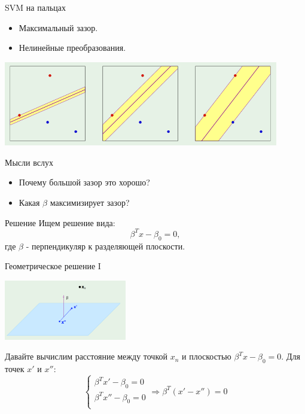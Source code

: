 \documentclass[14pt, fleqn, xcolor={dvipsnames, table}]{beamer}
\begin{document}
\begin{frame}{SVM на пальцах}
\begin{itemize}
  \item Максимальный зазор.
  \item Нелинейные преобразования.
\end{itemize}
\begin{center}
\includegraphics[width=0.9\textwidth]{SVM_1.png}
\end{center}
\end{frame}

\begin{frame}{Мысли вслух}
\begin{itemize}
  \item Почему большой зазор это хорошо?
  \item Какая $\beta$ максимизирует зазор? 
\end{itemize}
\end{frame}

\begin{frame}{Решение}
Ищем решение вида: \
$$
\beta^Tx - \beta_0 = 0,
$$ 
где $\beta$ - перпендикуляр к разделяющей плоскости. %

\end{frame}


\begin{frame}{Геометрическое решение I}
\begin{center}
\includegraphics[width=0.4\textwidth]{SVM_2.png}
\end{center}
Давайте вычислим расстояние между точкой $x_n$ и плоскостью $\beta^Tx - \beta_0 = 0$.
Для точек $x'$ и $x''$:\
$$
\left\{  
           \begin{array}{ll}  
            \beta^T x' - \beta_0 = 0 \\  
            \beta^T x'' - \beta_0 = 0 \\
           \end{array}   
           \right.
\Rightarrow \beta^T (x' - x'') = 0
$$

\end{frame}
\end{document}
